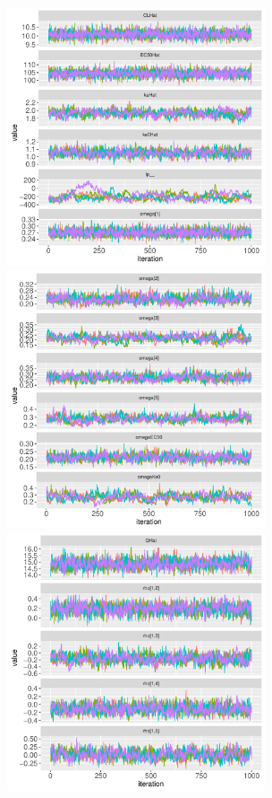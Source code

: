 \documentclass[11pt]{amsart}
\begin{document}
\clearpage

\begin{figure}[!htb]
\includegraphics[width=3.0in,trim=0in 0in 0 0in]{graphics/effCptModelTorsten/effCptModelTorstenPlots001.pdf}
\includegraphics[width=3.0in,trim=0in 0in 0 0in]{graphics/effCptModelTorsten/effCptModelTorstenPlots002.pdf}
\includegraphics[width=3.0in,trim=0in 0in 0 0in]{graphics/effCptModelTorsten/effCptModelTorstenPlots003.pdf}

\end{figure}
\end{document}
